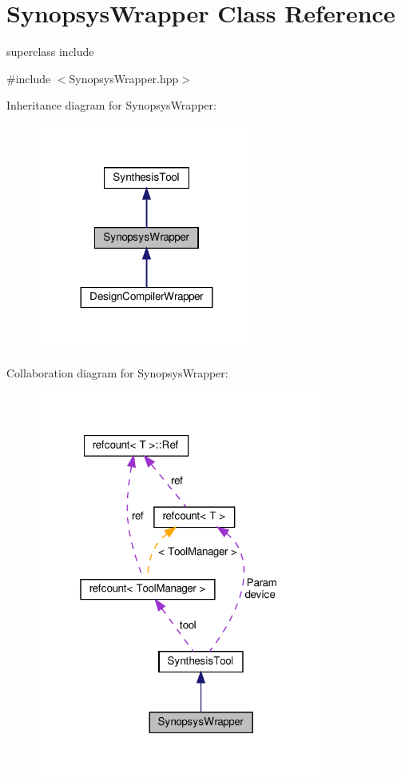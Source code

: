 \hypertarget{classSynopsysWrapper}{}\section{Synopsys\+Wrapper Class Reference}
\label{classSynopsysWrapper}


superclass include  




{\ttfamily \#include $<$Synopsys\+Wrapper.\+hpp$>$}



Inheritance diagram for Synopsys\+Wrapper\+:
\nopagebreak
\begin{figure}[H]
\begin{center}
\leavevmode
\includegraphics[width=203pt]{d8/d4e/classSynopsysWrapper__inherit__graph}
\end{center}
\end{figure}


Collaboration diagram for Synopsys\+Wrapper\+:
\nopagebreak
\begin{figure}[H]
\begin{center}
\leavevmode
\includegraphics[width=265pt]{d9/dfa/classSynopsysWrapper__coll__graph}
\end{center}
\end{figure}
